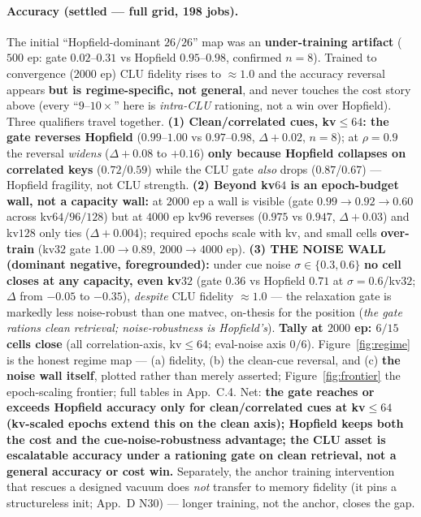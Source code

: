 \documentclass[11pt]{article}
\begin{document}
\paragraph{Accuracy (settled --- full grid, 198 jobs).} The initial ``Hopfield-dominant $26/26$'' map was an \textbf{under-training artifact} ($500$ ep: gate $0.02$--$0.31$ vs Hopfield $0.95$--$0.98$, confirmed $n=8$). Trained to convergence ($2000$ ep) CLU fidelity rises to $\approx1.0$ and the accuracy reversal appears \textbf{but is regime-specific, not general}, and never touches the cost story above (every ``$9$--$10\times$'' here is \emph{intra-CLU} rationing, not a win over Hopfield). Three qualifiers travel together. \textbf{(1) Clean/correlated cues, kv$\le64$: the gate reverses Hopfield} ($0.99$--$1.00$ vs $0.97$--$0.98$, $\Delta+0.02$, $n=8$); at $\rho=0.9$ the reversal \emph{widens} ($\Delta+0.08$ to $+0.16$) \textbf{only because Hopfield collapses on correlated keys} ($0.72$/$0.59$) while the CLU gate \emph{also} drops ($0.87$/$0.67$) --- Hopfield fragility, not CLU strength. \textbf{(2) Beyond kv$64$ is an epoch-budget wall, not a capacity wall:} at $2000$ ep a wall is visible (gate $0.99\to0.92\to0.60$ across kv$64/96/128$) but at $4000$ ep kv$96$ reverses ($0.975$ vs $0.947$, $\Delta+0.03$) and kv$128$ only ties ($\Delta+0.004$); required epochs scale with kv, and small cells \textbf{over-train} (kv$32$ gate $1.00\to0.89$, $2000\to4000$ ep). \textbf{(3) THE NOISE WALL (dominant negative, foregrounded):} under cue noise $\sigma\in\{0.3,0.6\}$ \textbf{no cell closes at any capacity, even kv$32$} (gate $0.36$ vs Hopfield $0.71$ at $\sigma{=}0.6$/kv$32$; $\Delta$ from $-0.05$ to $-0.35$), \emph{despite} CLU fidelity $\approx1.0$ --- the relaxation gate is markedly less noise-robust than one matvec, on-thesis for the position (\emph{the gate rations clean retrieval; noise-robustness is Hopfield's}). \textbf{Tally at $2000$ ep: $6/15$ cells close} (all correlation-axis, kv$\le64$; eval-noise axis $0/6$). Figure~\ref{fig:regime} is the honest regime map --- (a) fidelity, (b) the clean-cue reversal, and (c) \textbf{the noise wall itself}, plotted rather than merely asserted; Figure~\ref{fig:frontier} the epoch-scaling frontier; full tables in App.~C.4. Net: \textbf{the gate reaches or exceeds Hopfield accuracy only for clean/correlated cues at kv$\le64$ (kv-scaled epochs extend this on the clean axis); Hopfield keeps both the cost and the cue-noise-robustness advantage; the CLU asset is escalatable accuracy under a rationing gate on clean retrieval, not a general accuracy or cost win.} Separately, the anchor training intervention that rescues a designed vacuum does \emph{not} transfer to memory fidelity (it pins a structureless init; App.~D N30) --- longer training, not the anchor, closes the gap.
\end{document}
